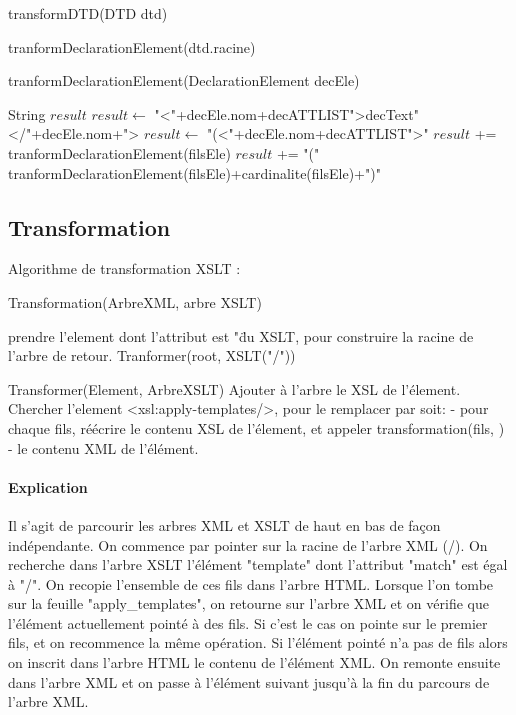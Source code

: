    \begin{algorithm}
	\caption{transformDTD(DTD dtd)}
    \begin{algorithmic}
	    \RETURN tranformDeclarationElement(dtd.racine) 
    \end{algorithmic}
    \end{algorithm}
        
    \begin{algorithm}
	\caption{tranformDeclarationElement(DeclarationElement decEle)}    
    \begin{algorithmic}
	    \STATE String $result$  
		    \STATE $result \gets$ "\textless"+decEle.nom+decATTLIST"\textgreater decText"\textless/"+decEle.nom+"\textgreater
	    \ELSE
		    \STATE $result \gets$ "(\textless"+decEle.nom+decATTLIST"\textgreater"
				    \STATE $result$ += tranformDeclarationElement(filsEle)
			    \ELSE
				    \STATE $result$ += "(" tranformDeclarationElement(filsEle)+cardinalite(filsEle)+")"
		        \ENDIF
	        \ENDFOR
	    \ENDIF
	\end{algorithmic}
    \end{algorithm}
        
    \subsection{Transformation}
     Algorithme de transformation XSLT :

	Transformation(ArbreXML, arbre XSLT)
	
		prendre l'element dont l'attribut est "\" du XSLT, pour construire la racine de l'arbre de retour.
		Tranformer(root, XSLT("/"))
	
	Transformer(Element, ArbreXSLT)	
		Ajouter à l'arbre le XSL de l'élement.
		Chercher l'element <xsl:apply-templates/>, pour le remplacer par soit:
			- pour chaque fils, réécrire le contenu XSL de l'élement, et appeler transformation(fils, ) 
			- le contenu XML de l'élément.

 
	\paragraph{Explication} Il s'agit de parcourir les arbres XML et XSLT de haut en bas de façon indépendante.
	On commence par pointer sur la racine de l'arbre XML (/). On recherche dans l'arbre XSLT l'élément "template" dont l'attribut "match" est égal à "/".
	On recopie l'ensemble de ces fils dans l'arbre HTML. Lorsque l'on tombe sur la feuille "apply_templates", on retourne sur l'arbre XML et on vérifie que l'élément actuellement pointé à des fils. Si c'est le cas on pointe sur le premier fils, et on recommence la même opération. Si l'élément pointé n'a pas de fils alors on inscrit dans l'arbre HTML le contenu de l'élément XML. On remonte ensuite dans l'arbre XML et on passe à l'élément suivant jusqu'à la fin du parcours de l'arbre XML.

